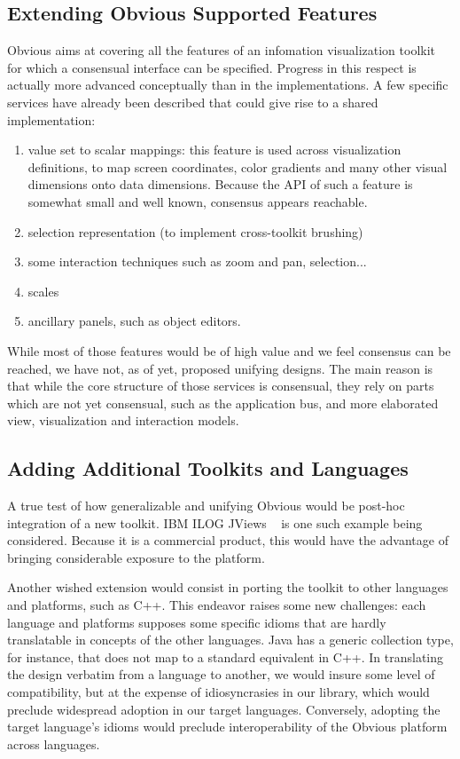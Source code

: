 
\subsection{Extending Obvious Supported Features}

Obvious aims at covering all the features of an infomation
visualization toolkit for which a consensual interface can be
specified.  Progress in this respect is actually more advanced
conceptually than in the implementations.  A few specific services
have already been described that could give rise to a shared
implementation:

\begin{enumerate}
\item value set to scalar mappings: this feature is used across
  visualization definitions, to map screen coordinates, color
  gradients and many other visual dimensions onto data
  dimensions. Because the API of such a feature is somewhat small and
  well known, consensus appears reachable.
\item selection representation (to implement cross-toolkit brushing)
\item some interaction techniques such as zoom and pan, selection...
\item scales
\item ancillary panels, such as object editors.
\end{enumerate}

While most of those features would be of high value and we feel consensus can be reached, we have not, as of yet, proposed unifying designs. The main reason is that while the core structure of those services is consensual, they rely on parts which are not yet consensual, such as the application bus, and more elaborated view, visualization and interaction models.

\subsection{Adding Additional Toolkits and Languages}

A true test of how generalizable and unifying Obvious would be
post-hoc integration of a new toolkit. IBM ILOG JViews ~\cite{JViews2} is
one such example being considered. Because it is a commercial product, this would 
have the advantage of bringing considerable exposure to the platform. 

Another wished extension would consist in porting the toolkit to other
languages and platforms, such as C++. This endeavor raises some new
challenges: each language and platforms supposes some specific idioms
that are hardly translatable in concepts of the other languages. Java
has a generic collection type, for instance, that does not map to a
standard equivalent in C++. In translating the design verbatim from a
language to another, we would insure some level of compatibility, but
at the expense of idiosyncrasies in our library, which would preclude
widespread adoption in our target languages. Conversely, adopting the
target language's idioms would preclude interoperability of the
Obvious platform across languages.


